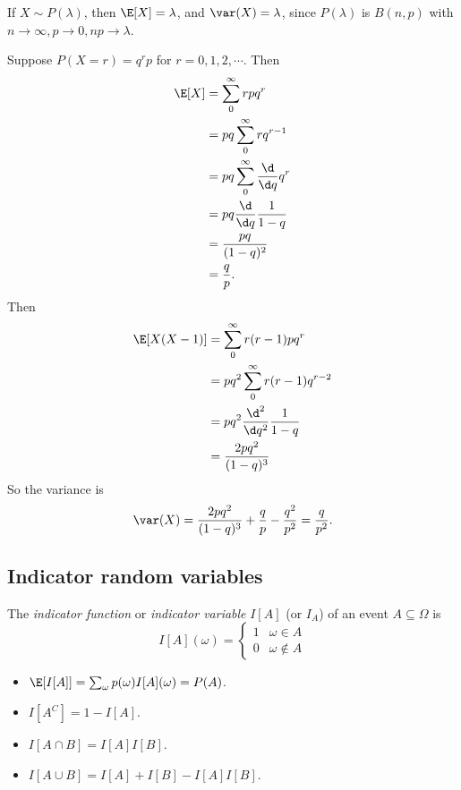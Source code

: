 \documentclass[a4paper]{article}
\begin{document}
\begin{eg}
  If $X\sim P(\lambda)$, then $\E[X] = \lambda$, and $\var(X) = \lambda$, since $P(\lambda)$ is $B(n, p)$ with $n\to \infty, p \to 0, np \to \lambda$.
\end{eg}

\begin{eg}
  Suppose $P(X = r) = q^r p$ for $r= 0, 1, 2, \cdots$. Then
  \begin{align*}
    \E[X] &= \sum_{0}^\infty rpq^r \\
    &= pq\sum_{0}^\infty rq^{r - 1}\\
    &= pq\sum_{0}^\infty \frac{\d }{\d q}q^r\\
    &= pq\frac{\d }{\d q}\frac{1}{1 - q}\\
    &= \frac{pq}{(1 - q)^2}\\
    &= \frac{q}{p}.
  \end{align*}
  Then
  \begin{align*}
    \E[X(X - 1)] &= \sum_{0}^\infty r(r - 1)pq^r\\
    &= pq^2 \sum_0^\infty r(r - 1)q^{r - 2}\\
    &= pq^2\frac{\d ^2}{\d q^2}\frac{1}{1 - q}\\
    &= \frac{2pq^2}{(1 - q)^3}\\
  \end{align*}
  So the variance is
  \[
    \var(X) = \frac{2pq^2}{(1 - q)^3}+ \frac{q}{p} - \frac{q^2}{p^2} = \frac{q}{p^2}.
  \]
\end{eg}

\subsection{Indicator random variables}
\begin{defi}
  The \emph{indicator function} or \emph{indicator variable} $I[A]$ (or $I_A$) of an event $A\subseteq \Omega$ is
  \[
    I[A](\omega) =
    \begin{cases}
      1 & \omega\in A\\
      0 & \omega\not\in A
    \end{cases}
  \]
\end{defi}

\begin{prop}\leavevmode
  \begin{itemize}
    \item $\E[I[A]] = \sum_\omega p(\omega) I[A](\omega) = P(A)$.
    \item $I[A^C] = 1 - I[A]$.
    \item $I[A\cap B] = I[A]I[B]$.
    \item $I[A\cup B] = I[A] + I[B] - I[A]I[B]$.
  \end{itemize}
\end{prop}
\end{document}

